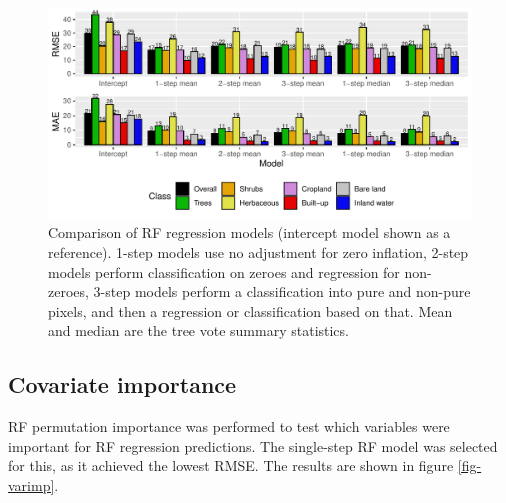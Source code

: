 \documentclass[review,authoryear,3p]{elsarticle}
\begin{document}
\begin{figure}
    \centering
    \includegraphics[width=\textwidth]{article-figures/barplots/2020-06-04-rf-comparison-bar}
    \caption{Comparison of \gls{RF} regression models (intercept model shown as a reference). 1-step models use no adjustment for zero inflation, 2-step models perform classification on zeroes and regression for non-zeroes, 3-step models perform a classification into pure and non-pure pixels, and then a regression or classification based on that. Mean and median are the tree vote summary statistics.}
    \label{fig-randomforest}
\end{figure}

\subsection{Covariate importance}

\Gls{RF} permutation importance was performed to test which variables were important for \gls{RF} regression predictions.
The single-step \gls{RF} model was selected for this, as it achieved the lowest \gls{RMSE}.
The results are shown in figure \ref{fig-varimp}.
\end{document}
